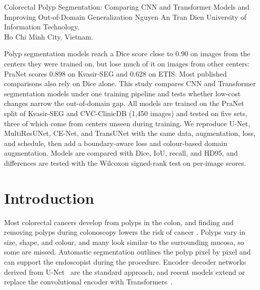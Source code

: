 \documentclass[10pt,twoside]{article}
\begin{document}
\makereporttitle
  {Colorectal Polyp Segmentation: Comparing CNN and Transformer Models and Improving Out-of-Domain Generalization}
  {Nguyen An Tran Dien}
  {University of Information Technology,\\ Ho Chi Minh City, Vietnam.}

\begin{reportabstract}[Abstract]
 Polyp segmentation models reach a Dice score close to 0.90 on
images from the centers they were trained on, but lose much of it on images from
other centers: PraNet scores 0.898 on Kvasir-SEG and 0.628 on ETIS. Most published
comparisons also rely on Dice alone. This study compares CNN and Transformer
segmentation models under one training pipeline and tests whether low-cost changes
narrow the out-of-domain gap.
 All models are trained on the PraNet split of Kvasir-SEG and
CVC-ClinicDB (1,450 images) and tested on five sets, three of which come from
centers unseen during training. We reproduce U-Net, MultiResUNet, CE-Net, and
TransUNet  with the same data, augmentation, loss, and schedule,
then add a boundary-aware loss and colour-based domain augmentation. Models are
compared with Dice, IoU, recall, and HD95, and differences are tested with the
Wilcoxon signed-rank test on per-image scores.
 
 
\end{reportabstract}

\section{Introduction}
Most colorectal cancers develop from polyps in the colon, and finding and removing
polyps during colonoscopy lowers the risk of cancer \ph{[citation]}. Polyps vary in
size, shape, and colour, and many look similar to the surrounding mucosa, so some
are missed. Automatic segmentation outlines the polyp pixel by pixel and can support
the endoscopist during the procedure. Encoder--decoder networks derived from
U-Net~\cite{ronneberger2015unet} are the standard approach, and recent models extend
or replace the convolutional encoder with
Transformers~\cite{chen2021transunet,cao2022swinunet}.
\end{document}

